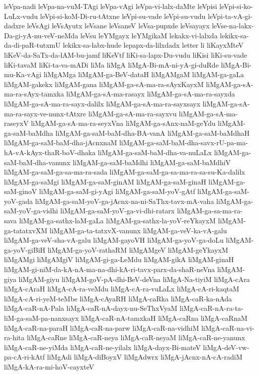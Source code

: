 {leVpa-nadi
leVpa-na-vuM-TAgi
leVpa-vAgi
leVpa-vi-lalx-daMte
leVpisi
leVpi-si-ko-LuLx-vudu
leVpi-si-koM-Di-ru-tAtxne
leVpi-su-vade
leVpi-su-vudu
leVpi-ta-vA-gi-dadxre
leVsAgi
leVsAyutx
leVsane
leVsaneV
leVsa-pupxde
leVsayayx
leVse-na-lakx-Da-gi-yA-nu-veV-neMda
leVsu
leYMgayx
leYMgikaM
lekakx-vi-lalxda
lekikx-sa-da-di-paR-tutxmU
lekikx-sa-labx-hude
lepapx-da-lilxdadx
letter
li
liKayxMteV
liKeV-da-SaTx-da-lAM-bu-jamf
liKeVtf
liKi-sa-lapx-Du-vudu
liKisi
liKi-su-vade
liKi-tavaM
liKi-ta-va-mADi
liMa
liMgA
liMgA-Bi-mA-ni-yA-gi-duRde
liMgA-Bi-mu-Ka-vAgi
liMgAMga
liMgAM-ga-BeV-dataH
liMgAMgaM
liMgAM-ga-gaLa
liMgAM-gakekx
liMgAM-gana
liMgAM-ga-sA-ma-ra-sAyxKayxM
liMgAM-ga-sA-ma-ra-sAyx-tamxka
liMgAM-ga-sA-ma-rasayx
liMgAM-ga-sA-ma-ra-sayxda
liMgAM-ga-sA-ma-ra-sayx-dalilx
liMgAM-ga-sA-ma-ra-sayxsayx
liMgAM-ga-sA-ma-ra-sayx-ve-nunx-tAtxre
liMgAM-ga-sA-ma-ra-sayxvu
liMgAM-ga-sA-ma-raseyxV
liMgAM-ga-sA-ma-ra-seyxVna
liMgAM-ga-sAnx-naM-geYdu
liMgAM-ga-saM-baMdha
liMgAM-ga-saM-baM-dha-BA-vanA
liMgAM-ga-saM-baMdhaH
liMgAM-ga-saM-baM-dha-jAcnxnaM
liMgAM-ga-saM-baM-dha-savx-rU-pa-ma-hA-vA-kAyx-thaR-boV-dhaka
liMgAM-ga-saM-baM-dha-va-nuLaLx
liMgAM-ga-saM-baM-dha-vanunx
liMgAM-ga-saM-baMdhi
liMgAM-ga-saM-baMdhiV
liMgAM-ga-saM-ga-sa-ma-ra-sada
liMgAM-ga-saM-ga-sa-ma-ra-sa-su-Ka-dalilx
liMgAM-ga-saMgi
liMgAM-ga-saM-ginAM
liMgAM-ga-saM-ginaH
liMgAM-ga-saM-ginoV
liMgAM-ga-saM-gi-yAgi
liMgAM-ga-saM-yoV-gAtf
liMgAM-ga-saM-yoV-gada
liMgAM-ga-saM-yoV-ga-jAcnx-na-ni-SaThx-tavx-mA-vaha
liMgAM-ga-saM-yoV-ga-vidhi
liMgAM-ga-saM-yoV-ga-vi-dhi-ratarx
liMgAM-ga-sa-ma-ra-sava
liMgAM-ga-sathx-laM-gaLa
liMgAM-ga-sathx-la-yoV-reYkayxM
liMgAM-ga-tatatxvXM
liMgAM-ga-ta-tatxvX-vanunx
liMgAM-ga-veV-ka-vA-galu
liMgAM-ga-veV-sha-vA-galu
liMgAM-gayoVH
liMgAM-ga-yoV-ga-doLu
liMgAM-ga-yoV-giBiH
liMgAM-ga-yoV-rathaRM
liMgAMgeV
liMgAM-geYkayxM
liMgAMgi
liMgAMgiV
liMgAM-gi-ga-LeMdu
liMgAM-gikA
liMgAM-ginaH
liMgAM-gi-niM-da-kA-nA-ma-na-dhi-kA-ri-tavx-parx-da-shaR-neVna
liMgAM-giya
liMgAM-giyu
liMgAM-goV-pA-dhi-BeV-deVna
liMgA-Na-tiyiM
liMgA-cAra
liMgA-cAraH
liMgA-cA-ra-veMdu
liMgA-cA-ra-vuLaLx
liMgA-cA-ri-kaqtaM
liMgA-cA-ri-yeM-teMbe
liMgA-cAyaRH
liMgA-caRka
liMgA-caR-ka-nAda
liMgA-caR-nA-Pala
liMgA-caR-nA-dayx-nu-SeThxVyaM
liMgA-caR-nA-ra-ta-liM-ga-saM-pa-nanxsayx
liMgA-caR-nA-tamxkaH
liMgA-caRna
liMgA-caRnaM
liMgA-caR-na-paraH
liMgA-caR-na-parw
liMgA-caR-na-vidhiM
liMgA-caR-na-vi-ra-hita
liMgA-caRne
liMgA-caR-neya
liMgA-caR-neyaM
liMgA-caR-ne-yanunx
liMgA-caR-ne-yiMda
liMgA-caR-ne-yilalx
liMgA-dayx-Bi-mateV
liMgA-deV-vw-pa-cA-ri-kAtf
liMgAdi
liMgA-diBoyxV
liMgAdwrx
liMgA-jAcnx-nA-cA-radiM
liMgA-kA-ra-mi-hoV-cayxteV
}
